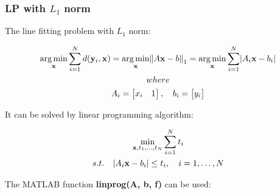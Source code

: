 \documentclass[paper=a4, fontsize=11pt]{scrartcl} %
\numberwithin{equation}{section} %
\numberwithin{figure}{section} %
\numberwithin{table}{section} %
\newcommand{\funcname}[1]{\textbf{#1}}
\renewcommand{\vec}[1]{\mathbf{#1}}
\DeclareMathOperator*{\argmin}{arg\,min} %
\begin{document}
\subsubsection{LP with $L_{1}$ norm }

The line fitting problem with $L_{1}$ norm: 

\begin{gather*}
\argmin_{\vec{x}} \sum_{i=1}^{N} d(\vec{y}_{i}, \vec{x}) = \argmin_{\vec{x}} \norm{A\vec{x} - b}_{1}  = 
\argmin_{\vec{x}} \sum_{i=1}^{N} \abs{A_{i}\vec{x} - b_{i}} \\
where \\
A_{i} = 
\begin{bmatrix}
    x_{i}	&	1 
\end{bmatrix},
\quad b_{i} = 
\begin{bmatrix}
    y_{i}	
\end{bmatrix}
\end{gather*}

It can be solved by linear programming algorithm:

\begin{gather*}
\min_{\vec{x}, t_{1}, \dots, t_{N}} \sum_{i=1}^{N} t_{i} \\
 s.t. \quad \abs{A_{i}\vec{x} - b_{i}} \leq t_{i}, \quad i = 1, \dots, N
\end{gather*}

The MATLAB function \funcname{linprog(A, b, f)} can be used:
\end{document}
